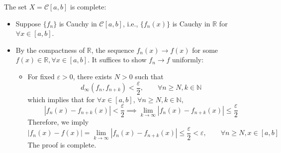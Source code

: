 \begin{example}
The set $X=\mathcal{C}[a,b]$ is complete:
\begin{itemize}
\item
Suppose $\{f_n\}$ is Cauchy in $\mathcal{C}[a,b]$, i.e., $\{f_n(x)\}$ is Cauchy in $\mathbb{R}$ for $\forall x\in[a,b]$.
\item
By the compactness of $\mathbb{R}$, the sequence $f_n(x)\to f(x)$ for some $f(x)\in\mathbb{R},\forall x\in[a,b]$. It suffices to show $f_n\to f$ uniformly:
\begin{itemize}
\item
For fixed $\varepsilon>0$, there exists $N>0$ such that
\[
d_\infty(f_n,f_{n+k})<\frac{\varepsilon}{2},\qquad
\forall n\ge N,k\in\mathbb{N}
\]
which implies that for $\forall x\in[a,b]$, $\forall n\ge N,k\in\mathbb{N}$,
\[
|f_n(x)-f_{n+k}(x)|<\frac{\varepsilon}{2}
\implies
\lim_{k\to\infty}|f_n(x)-f_{n+k}(x)|\le\frac{\varepsilon}{2}
\]
Therefore, we imply
\[
|f_n(x)-f(x)|=\lim_{k\to\infty}|f_n(x)-f_{n+k}(x)|\le\frac{\varepsilon}{2}<\varepsilon,\qquad
\forall n\ge N,x\in[a,b]
\]
The proof is complete.
\end{itemize}
\end{itemize}
\end{example}


















